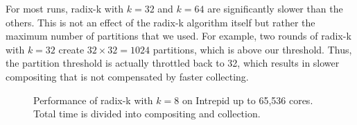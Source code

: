 \documentclass{acm_proc_article-sp}
\begin{document}
For most runs, radix-k with $k=32$ and $k=64$ are significantly slower than
the others.  This is not an effect of the radix-k algorithm itself but
rather the maximum number of partitions that we used.  For example, two
rounds of radix-k with $k=32$ create $32 \times 32 = 1024$ partitions,
which is above our threshold.  Thus, the partition threshold is actually
throttled back to 32, which results in slower compositing that is not
compensated by faster collecting.

\begin{figure}[htbp]
  \centering
  \hfill
  \caption{Performance of radix-k with $k=8$ on Intrepid up to 65,536
    cores.  Total time is divided into compositing and collection.}
  \label{fig:ScalingCollect}
\end{figure}
\end{document}
